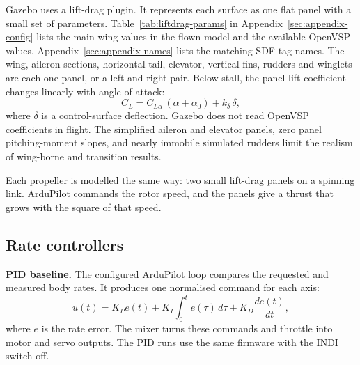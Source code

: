 \documentclass{article}
\begin{document}
Gazebo uses a lift-drag plugin. It represents each surface as one flat panel with a small set of parameters. Table~\ref{tab:liftdrag-params} in Appendix~\ref{sec:appendix-config} lists the main-wing values in the flown model and the available OpenVSP values. Appendix~\ref{sec:appendix-names} lists the matching SDF tag names. The wing, aileron sections, horizontal tail, elevator, vertical fins, rudders and winglets are each one panel, or a left and right pair. Below stall, the panel lift coefficient changes linearly with angle of attack:
\begin{equation}
    C_L = C_{L\alpha}\,(\alpha+\alpha_0) + k_\delta\,\delta ,
    \label{eq:gazebo-lift}
\end{equation}
where $\delta$ is a control-surface deflection. Gazebo does not read OpenVSP coefficients in flight. The simplified aileron and elevator panels, zero panel pitching-moment slopes, and nearly immobile simulated rudders limit the realism of wing-borne and transition results.

Each propeller is modelled the same way: two small lift-drag panels on a spinning link. ArduPilot commands the rotor speed, and the panels give a thrust that grows with the square of that speed.

\subsection{Rate controllers}
\label{sec:pid}
\label{sec:indi-implementation}
\textbf{PID baseline.} The configured ArduPilot loop compares the requested and measured body rates. It produces one normalised command for each axis:
\begin{equation}
    u(t)=K_Pe(t)+K_I\int_0^t e(\tau)\,d\tau+K_D\frac{de(t)}{dt},
    \label{eq:pid}
\end{equation}
where $e$ is the rate error. The mixer turns these commands and throttle into motor and servo outputs. The PID runs use the same firmware with the INDI switch off.
\end{document}
